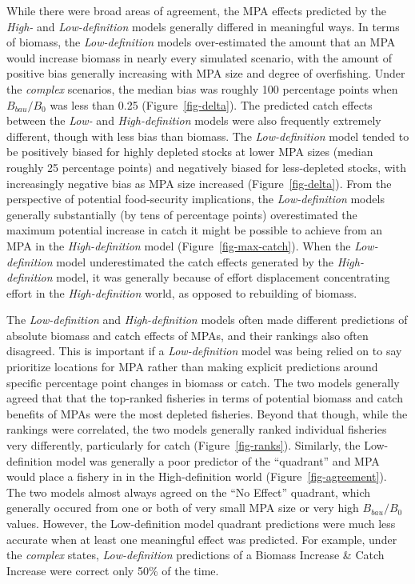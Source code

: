 \documentclass[
  default,
  lineno,
  referee]{sn-jnl}
\begin{document}
While there were broad areas of agreement, the MPA effects predicted by
the \emph{High-} and \emph{Low-definition} models generally differed in
meaningful ways. In terms of biomass, the \emph{Low-definition} models
over-estimated the amount that an MPA would increase biomass in nearly
every simulated scenario, with the amount of positive bias generally
increasing with MPA size and degree of overfishing. Under the
\emph{complex} scenarios, the median bias was roughly 100 percentage
points when \(B_{bau}/B_0\) was less than 0.25 (Figure~\ref{fig-delta}).
The predicted catch effects between the \emph{Low-} and
\emph{High-definition} models were also frequently extremely different,
though with less bias than biomass. The \emph{Low-definition} model
tended to be positively biased for highly depleted stocks at lower MPA
sizes (median roughly 25 percentage points) and negatively biased for
less-depleted stocks, with increasingly negative bias as MPA size
increased (Figure~\ref{fig-delta}). From the perspective of potential
food-security implications, the \emph{Low-definition} models generally
substantially (by tens of percentage points) overestimated the maximum
potential increase in catch it might be possible to achieve from an MPA
in the \emph{High-definition} model (Figure~\ref{fig-max-catch}). When
the \emph{Low-definition} model underestimated the catch effects
generated by the \emph{High-definition} model, it was generally because
of effort displacement concentrating effort in the
\emph{High-definition} world, as opposed to rebuilding of biomass.

The \emph{Low-definition} and \emph{High-definition} models often made
different predictions of absolute biomass and catch effects of MPAs, and
their rankings also often disagreed. This is important if a
\emph{Low-definition} model was being relied on to say prioritize
locations for MPA rather than making explicit predictions around
specific percentage point changes in biomass or catch. The two models
generally agreed that that the top-ranked fisheries in terms of
potential biomass and catch benefits of MPAs were the most depleted
fisheries. Beyond that though, while the rankings were correlated, the
two models generally ranked individual fisheries very differently,
particularly for catch (Figure~\ref{fig-ranks}). Similarly, the
Low-definition model was generally a poor predictor of the ``quadrant''
and MPA would place a fishery in in the High-definition world
(Figure~\ref{fig-agreement}). The two models almost always agreed on the
``No Effect'' quadrant, which generally occured from one or both of very
small MPA size or very high \(B_{bau}/B_0\) values. However, the
Low-definition model quadrant predictions were much less accurate when
at least one meaningful effect was predicted. For example, under the
\emph{complex} states, \emph{Low-definition} predictions of a Biomass
Increase \& Catch Increase were correct only 50\% of the time.
\end{document}
